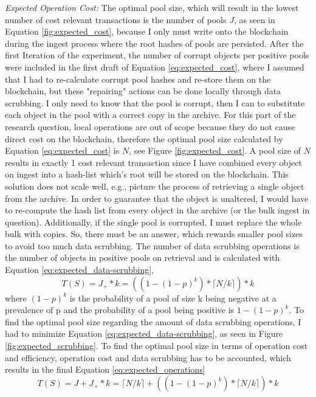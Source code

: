 \textit{Expected Operation Cost:} The optimal pool size, which will result in the lowest number of cost relevant transactions is the number of pools $J$, as seen in Equation \ref{fig:expected_cost}, because I only must write onto the blockchain during the ingest process where the root hashes of pools are persisted.
After the first Iteration of the experiment, the number of corrupt objects per positive pools were included in the first draft of Equation \ref{eq:expected_cost}, where I assumed that I had to re-calculate corrupt pool hashes and re-store them on the blockchain, but these "repairing" actions can be done locally through data scrubbing. I only need to know that the pool is corrupt, then I can to substitute each object in the pool with a correct copy in the archive. For this part of the research question, local operations are out of scope because they do not cause direct cost on the blockchain, therefore the optimal pool size calculated by Equation \ref{eq:expected_cost} is $N$, see Figure \ref{fig:expected_cost}. A pool size of $N$ results in exactly 1 cost relevant transaction since I have combined every object on ingest into a hash-list which's root will be stored on the blockchain. This solution does not scale well, e.g., picture the process of retrieving a single object from the archive. In order to guarantee that the object is unaltered, I would have to re-compute the hash list from every object in the archive (or the bulk ingest in question). Additionally, if the single pool is corrupted, I must replace the whole bulk with copies. 
So, there must be an answer, which rewards smaller pool sizes to avoid too much data scrubbing. The number of data scrubbing operations is the number of objects in positive pools on retrieval and is calculated with Equation \ref{eq:expected_data-scrubbing},
\begin{equation}\label{eq:expected_data-scrubbing}
    T(S) = J_+ * k = ((1-(1-p)^k)* \lceil N/k \rceil) * k
\end{equation}
where $(1-p)^k$ is the probability of a pool of size k being negative at a prevalence of p and the probability of a pool being positive is $1-(1-p)^k$. To find the optimal pool size regarding the amount of data scrubbing operations, I had to minimize Equation \ref{eq:expected_data-scrubbing}, as seen in Figure \ref{fig:expected_scrubbing}.
To find the optimal pool size in terms of operation cost and efficiency, operation cost and data scrubbing has to be accounted, which results in the final Equation \ref{eq:expected_operations}
\begin{equation}\label{eq:expected_operations}
    T(S) = J + J_+ * k = \lceil N/k \rceil + ((1-(1-p)^k)* \lceil N/k \rceil) * k
\end{equation}
